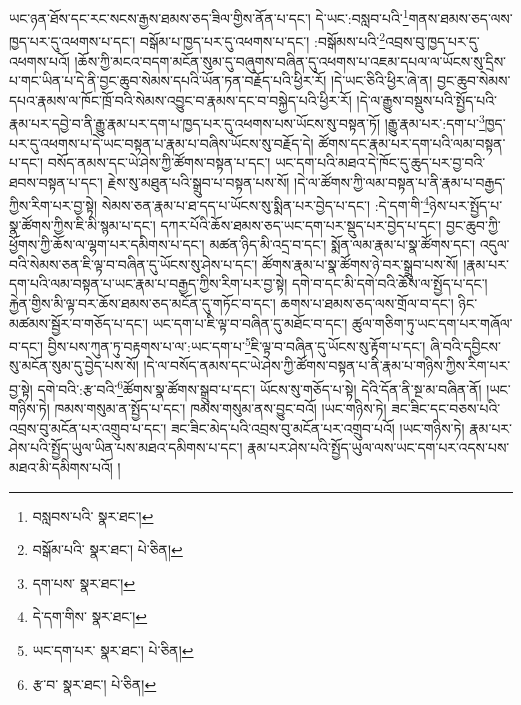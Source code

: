 ཡང་ཉན་ཐོས་དང་རང་སངས་རྒྱས་ཐམས་ཅད་ཟིལ་གྱིས་ནོན་པ་དང་། དེ་ཡང་:བསླབ་པའི་\footnote{བསླབས་པའི་  སྣར་ཐང་། }གནས་ཐམས་ཅད་ལས་ཁྱད་པར་དུ་འཕགས་པ་དང་། བསྒོམ་པ་ཁྱད་པར་དུ་འཕགས་པ་དང་། :བསྒོམས་པའི་\footnote{བསྒོམ་པའི་  སྣར་ཐང་།  པེ་ཅིན། }འབྲས་བུ་ཁྱད་པར་དུ་འཕགས་པའོ། །ཆོས་ཀྱི་མངའ་བདག་མངོན་སུམ་དུ་བཞུགས་བཞིན་དུ་འཕགས་པ་འཇམ་དཔལ་ལ་ཡོངས་སུ་དྲིས་པ་གང་ཡིན་པ་དེ་ནི་བྱང་ཆུབ་སེམས་དཔའི་ཡོན་ཏན་བརྗོད་པའི་ཕྱིར་རོ། །དེ་ཡང་ཅིའི་ཕྱིར་ཞེ་ན། བྱང་ཆུབ་སེམས་དཔའ་རྣམས་ལ་ཁོང་ཁྲོ་བའི་སེམས་འབྱུང་བ་རྣམས་དང་བ་བསྐྱེད་པའི་ཕྱིར་རོ། །དེ་ལ་རྒྱུས་བསྡུས་པའི་སྤྱོད་པའི་རྣམ་པར་དབྱེ་བ་ནི་རྒྱུ་རྣམ་པར་དག་པ་ཁྱད་པར་དུ་འཕགས་པས་ཡོངས་སུ་བསྟན་ཏོ། །རྒྱུ་རྣམ་པར་:དག་པ་\footnote{དག་པས་  སྣར་ཐང་། }ཁྱད་པར་དུ་འཕགས་པ་དེ་ཡང་བསྟན་པ་རྣམ་པ་བཞིས་ཡོངས་སུ་བརྗོད་དེ། ཚོགས་དང་རྣམ་པར་དག་པའི་ལམ་བསྟན་པ་དང་། བསོད་ནམས་དང་ཡེ་ཤེས་ཀྱི་ཚོགས་བསྟན་པ་དང་། ཡང་དག་པའི་མཐའ་དེ་ཁོང་དུ་ཆུད་པར་བྱ་བའི་ཐབས་བསྟན་པ་དང་། རྗེས་སུ་མཐུན་པའི་སྒྲུབ་པ་བསྟན་པས་སོ། །དེ་ལ་ཚོགས་ཀྱི་ལམ་བསྟན་པ་ནི་རྣམ་པ་བརྒྱད་ཀྱིས་རིག་པར་བྱ་སྟེ། སེམས་ཅན་རྣམ་པ་ཐ་དད་པ་ཡོངས་སུ་སྨིན་པར་བྱེད་པ་དང་། :དེ་དག་གི་\footnote{དེ་དག་གིས་  སྣར་ཐང་། }ཉེས་པར་སྤྱོད་པ་སྣ་ཚོགས་ཀྱིས་ཇི་མི་སྙམ་པ་དང་། དཀར་པོའི་ཆོས་ཐམས་ཅད་ཡང་དག་པར་སྡུད་པར་བྱེད་པ་དང་། བྱང་ཆུབ་ཀྱི་ཕྱོགས་ཀྱི་ཆོས་ལ་ལྷག་པར་དམིགས་པ་དང་། མཚན་ཉིད་མི་འདྲ་བ་དང་། སྨོན་ལམ་རྣམ་པ་སྣ་ཚོགས་དང་། འདུལ་བའི་སེམས་ཅན་ཇི་ལྟ་བ་བཞིན་དུ་ཡོངས་སུ་ཤེས་པ་དང་། ཚོགས་རྣམ་པ་སྣ་ཚོགས་ཉེ་བར་སྒྲུབ་པས་སོ། །རྣམ་པར་དག་པའི་ལམ་བསྟན་པ་ཡང་རྣམ་པ་བརྒྱད་ཀྱིས་རིག་པར་བྱ་སྟེ། དགེ་བ་དང་མི་དགེ་བའི་ཆོས་ལ་སྤྱོད་པ་དང་། རྐྱེན་གྱིས་མི་ལྟ་བར་ཆོས་ཐམས་ཅད་མངོན་དུ་གཏོང་བ་དང་། ཆགས་པ་ཐམས་ཅད་ལས་གྲོལ་བ་དང་། ཉིང་མཚམས་སྦྱོར་བ་གཅོད་པ་དང་། ཡང་དག་པ་ཇི་ལྟ་བ་བཞིན་དུ་མཐོང་བ་དང་། ཚུལ་གཅིག་ཏུ་ཡང་དག་པར་གཞོལ་བ་དང་། བྱིས་པས་ཀུན་ཏུ་བརྟགས་པ་ལ་:ཡང་དག་པ་\footnote{ཡང་དག་པར་  སྣར་ཐང་།  པེ་ཅིན། }ཇི་ལྟ་བ་བཞིན་དུ་ཡོངས་སུ་རྟོག་པ་དང་། ཞི་བའི་དབྱིངས་སུ་མངོན་སུམ་དུ་བྱེད་པས་སོ། །དེ་ལ་བསོད་ནམས་དང་ཡེ་ཤེས་ཀྱི་ཚོགས་བསྟན་པ་ནི་རྣམ་པ་གཉིས་ཀྱིས་རིག་པར་བྱ་སྟེ། དགེ་བའི་:རྩ་བའི་\footnote{རྩ་བ་  སྣར་ཐང་།  པེ་ཅིན། }ཚོགས་སྣ་ཚོགས་སྒྲུབ་པ་དང་། ཡོངས་སུ་གཅོད་པ་སྟེ། དེའི་དོན་ནི་སྔ་མ་བཞིན་ནོ། །ཡང་གཉིས་ཏེ། ཁམས་གསུམ་ན་སྤྱོད་པ་དང་། ཁམས་གསུམ་ནས་བྱུང་བའོ། །ཡང་གཉིས་ཏེ། ཟང་ཟིང་དང་བཅས་པའི་འབྲས་བུ་མངོན་པར་འགྲུབ་པ་དང་། ཟང་ཟིང་མེད་པའི་འབྲས་བུ་མངོན་པར་འགྲུབ་པའོ། །ཡང་གཉིས་ཏེ། རྣམ་པར་ཤེས་པའི་སྤྱོད་ཡུལ་ཡིན་པས་མཐའ་དམིགས་པ་དང་། རྣམ་པར་ཤེས་པའི་སྤྱོད་ཡུལ་ལས་ཡང་དག་པར་འདས་པས་མཐའ་མི་དམིགས་པའོ། །
